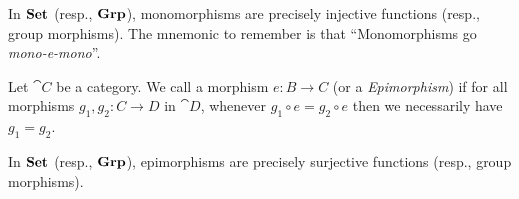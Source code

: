 \begin{node}[Category]
\begin{node}
\begin{node}[Example]\label{cat-000Z}%
In $\mathbf{Set}$ (resp., $\mathbf{Grp}$), monomorphisms are precisely injective functions
(resp., group morphisms). The mnemonic to remember is that
``Monomorphisms go \textit{mono-e-mono}''.
\end{node}

\begin{definition}\label{cat-0010}%
Let $\cat{C}$ be a category.
We call a morphism $e\colon B\to C$  (or a \textit{Epimorphism})
if for all morphisms $g_{1},g_{2}\colon C\to D$ in $\cat{D}$, 
whenever $g_{1}\circ e=g_{2}\circ e$ then we necessarily have $g_{1}=g_{2}$.
\end{definition}

\begin{node}[Example]\label{cat-0011}%
In $\mathbf{Set}$ (resp., $\mathbf{Grp}$), epimorphisms are precisely surjective functions
(resp., group morphisms).
\end{node}
\end{node}
\end{node} %

